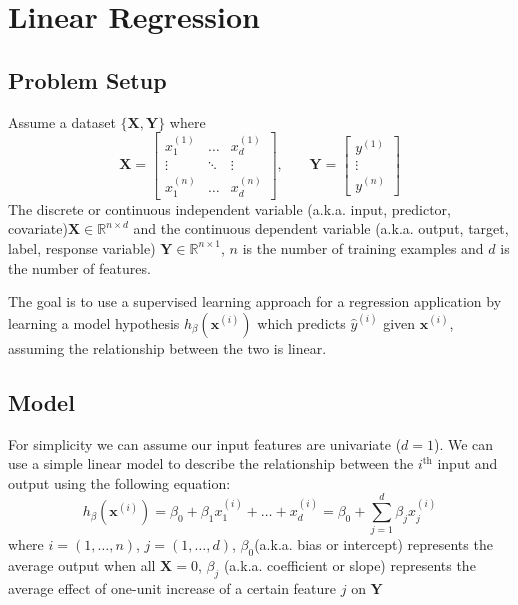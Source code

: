 \documentclass[../main.tex]{subfiles}
\begin{document}
\chapter{Linear Regression}

\section{Problem Setup}
Assume a dataset \(\{\mathbf{X}, \mathbf{Y}\}\) where
\[
	\mathbf{X} = \begin{bmatrix}
    x^{(1)}_1 & \dots & x^{(1)}_d \\
    \vdots & \ddots & \vdots \\
    x^{(n)}_1 & \dots & x^{(n)}_d
	\end{bmatrix}
	\text{,}\qquad
	\mathbf{Y} = \begin{bmatrix}
    y^{(1)}\\
    \vdots\\
    y^{(n)}
	\end{bmatrix}
\]
The discrete or continuous independent variable (a.k.a. input, predictor, covariate)\(\mathbf{X} \in \mathbb{R}^{n\times d}\) and the continuous dependent variable (a.k.a. output, target, label, response variable) \(\mathbf{Y} \in \mathbb{R}^{n\times 1}\), \(n\) is the number of training examples and \(d\) is the number of features. 

The goal is to use a supervised learning approach for a regression application by learning a model hypothesis \(h_\beta(\mathbf{x}^{(i)})\) which predicts \(\hat y^{(i)}\) given \(\mathbf{x}^{(i)}\), assuming the relationship between the two is linear.

\section{Model}
For simplicity we can assume our input features are univariate (\(d = 1\)). We can use a simple linear model to describe the relationship between the \(i^\text{th}\) input and output using the following equation:
\[
	\boxed{h_\beta(\mathbf{x}^{(i)}) = \beta_0 + \beta_1 x_1^{(i)} + \dots +  x_d^{(i)} = \beta_0 + \sum_{j=1}^d\beta_j  x_j^{(i)}}
\]
where \(i = (1,\dots,n)\), \(j = (1,\dots,d)\), \(\beta_0\)(a.k.a. bias or intercept) represents the average output when all \(\mathbf{X} = 0\), \(\beta_j\) (a.k.a. coefficient or slope) represents the average effect of one-unit increase of a certain feature \(j\) on \(\mathbf{Y}\)
\end{document}
